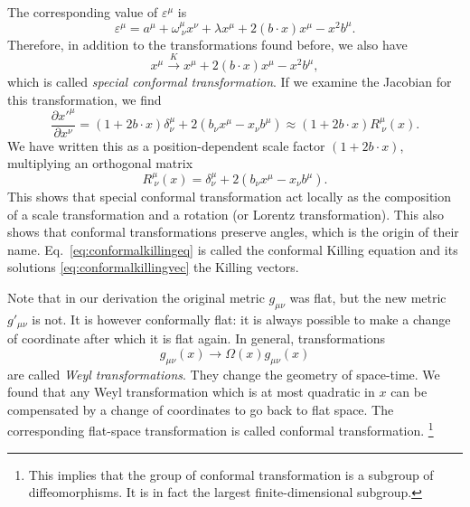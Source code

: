 \documentclass[a4paper,12pt]{article}
\numberwithin{equation}{section}
\begin{document}
The corresponding value of $\varepsilon^\mu$ is
\begin{equation}
	\varepsilon^\mu = a^\mu + \omega^\mu_{~\nu} x^\nu
	+ \lambda x^\mu
	+ 2 (b \cdot x) x^\mu - x^2 b^\mu.
	\label{eq:conformalkillingvec}
\end{equation}
Therefore, in addition to the transformations found before, we also have
\begin{equation}
	x^\mu \xrightarrow{K} x^\mu +  2 (b \cdot x) x^\mu - x^2 b^\mu,
\end{equation}
which is called \emph{special conformal transformation}.
If we examine the Jacobian for this transformation, we find
\begin{equation}
	\frac{\partial x'^\mu}{\partial x^\nu}
	= \left(1 + 2 b \cdot x \right) \delta^\mu_\nu
	+ 2 \left( b_\nu x^\mu - x_\nu b^\mu \right)
	\approx \left(1 + 2 b \cdot x \right)
	R^\mu_{~\nu}(x).
\end{equation}
We have written this as a position-dependent scale factor $(1 + 2 b \cdot x)$, multiplying an orthogonal matrix
\begin{equation}
	R^\mu_{~\nu}(x) = \delta^\mu_\nu
	+ 2 \left( b_\nu x^\mu - x_\nu b^\mu \right).
\end{equation}
This shows that special conformal transformation act locally as the composition of a scale transformation and a rotation (or Lorentz transformation). This also shows that conformal transformations preserve angles, which is the origin of their name.
Eq.~\eqref{eq:conformalkillingeq} is called the conformal Killing equation and its solutions \eqref{eq:conformalkillingvec} the Killing vectors.



Note that in our derivation the original metric $g_{\mu\nu}$ was flat, but the new metric $g'_{\mu\nu}$ is not. It is however conformally flat: it is always possible to make a change of coordinate after which it is flat again. In general, transformations
\begin{equation}
	g_{\mu\nu}(x) \to \Omega(x) g_{\mu\nu}(x)
\end{equation}
are called \emph{Weyl transformations}. They change the geometry of space-time. We found that any Weyl transformation which is at most quadratic in $x$ can be compensated by a change of coordinates to go back to flat space. The corresponding flat-space transformation is called conformal transformation.%
%
\footnote{This implies that the group of conformal transformation is a subgroup of diffeomorphisms. It is in fact the largest finite-dimensional subgroup.}%
\end{document}
